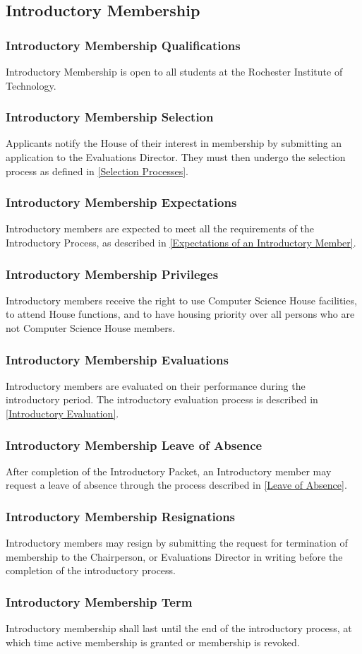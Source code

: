 \documentclass{article}
\newcommand{\asection}[1]{\subsection{#1} \label{#1}}
\newcommand{\asubsection}[1]{\subsubsection{#1} \label{#1}}
\begin{document}
\asection{Introductory Membership}
\asubsection{Introductory Membership Qualifications}
Introductory Membership is open to all students at the Rochester Institute of Technology.
\asubsection{Introductory Membership Selection}
Applicants notify the House of their interest in membership by submitting an application to the Evaluations Director.
They must then undergo the selection process as defined in \ref{Selection Processes}.
\asubsection{Introductory Membership Expectations}
Introductory members are expected to meet all the requirements of the Introductory Process, as described in \ref{Expectations of an Introductory Member}.
\asubsection{Introductory Membership Privileges}
Introductory members receive the right to use Computer Science House facilities, to attend House functions, and to have housing priority over all persons who are not Computer Science House members.
\asubsection{Introductory Membership Evaluations}
Introductory members are evaluated on their performance during the introductory period.
The introductory evaluation process is described in \ref{Introductory Evaluation}.
\asubsection{Introductory Membership Leave of Absence}
After completion of the Introductory Packet, an Introductory member may request a leave of absence through the process described in \ref{Leave of Absence}.
\asubsection{Introductory Membership Resignations}
Introductory members may resign by submitting the request for termination of membership to the Chairperson, or Evaluations Director in writing before the completion of the introductory process.
\asubsection{Introductory Membership Term}
Introductory membership shall last until the end of the introductory process, at which time active membership is granted or membership is revoked.
\end{document}

